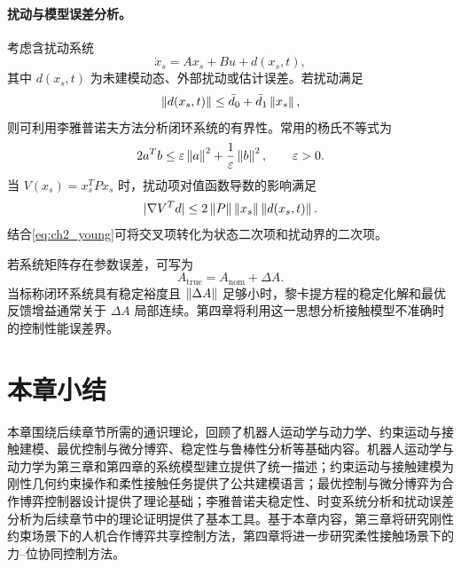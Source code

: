 \paragraph{扰动与模型误差分析。}
\label{subsec:ch2_robustness}

考虑含扰动系统
\begin{equation}
  \dot x_s=Ax_s+Bu+d(x_s,t),
  \label{eq:ch2_disturbed_system}
\end{equation}
其中 $d(x_s,t)$ 为未建模动态、外部扰动或估计误差。若扰动满足
\begin{equation}
  \left\lVert d(x_s,t)\right\rVert\le \bar d_0+\bar d_1\left\lVert x_s\right\rVert,
  \label{eq:ch2_disturbance_bound}
\end{equation}
则可利用李雅普诺夫方法分析闭环系统的有界性。常用的杨氏不等式为
\begin{equation}
  2a^Tb\le \varepsilon\left\lVert a\right\rVert^2+\frac{1}{\varepsilon}\left\lVert b\right\rVert^2,
  \qquad \varepsilon>0 .
  \label{eq:ch2_young}
\end{equation}
当 $V(x_s)=x_s^TPx_s$ 时，扰动项对值函数导数的影响满足
\begin{equation}
  |\nabla V^Td|\le 2\left\lVert P\right\rVert\left\lVert x_s\right\rVert\left\lVert d(x_s,t)\right\rVert .
  \label{eq:ch2_residual_value}
\end{equation}
结合\eqref{eq:ch2_young}可将交叉项转化为状态二次项和扰动界的二次项。

若系统矩阵存在参数误差，可写为
\begin{equation}
  A_{\mathrm{true}}=A_{\mathrm{nom}}+\Delta A .
  \label{eq:ch2_A_perturbation}
\end{equation}
当标称闭环系统具有稳定裕度且 $\left\lVert \Delta A\right\rVert$ 足够小时，黎卡提方程的稳定化解和最优反馈增益通常关于 $\Delta A$ 局部连续。第四章将利用这一思想分析接触模型不准确时的控制性能误差界。

\section{本章小结}
\label{sec:ch2_summary}

本章围绕后续章节所需的通识理论，回顾了机器人运动学与动力学、约束运动与接触建模、最优控制与微分博弈、稳定性与鲁棒性分析等基础内容。机器人运动学与动力学为第三章和第四章的系统模型建立提供了统一描述；约束运动与接触建模为刚性几何约束操作和柔性接触任务提供了公共建模语言；最优控制与微分博弈为合作博弈控制器设计提供了理论基础；李雅普诺夫稳定性、时变系统分析和扰动误差分析为后续章节中的理论证明提供了基本工具。基于本章内容，第三章将研究刚性约束场景下的人机合作博弈共享控制方法，第四章将进一步研究柔性接触场景下的力--位协同控制方法。
